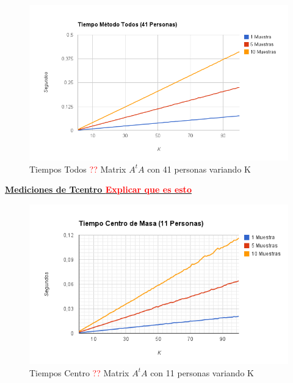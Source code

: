 \begin{figure}[H]
\includegraphics[width=1\textwidth]{img/image6.png}
     \caption{Tiempos Todos \textcolor{red}{??} Matrix $A^tA$ con 41 personas variando K}
     \label{fig:figura1}
\end{figure}


\underline{\textbf{Mediciones de Tcentro \textcolor{red}{Explicar que es esto}}}

\begin{figure}[H]
\includegraphics[width=1\textwidth]{img/image7.png}
     \caption{Tiempos Centro \textcolor{red}{??} Matrix $A^tA$ con 11 personas variando K}
     \label{fig:figura1}
\end{figure}


